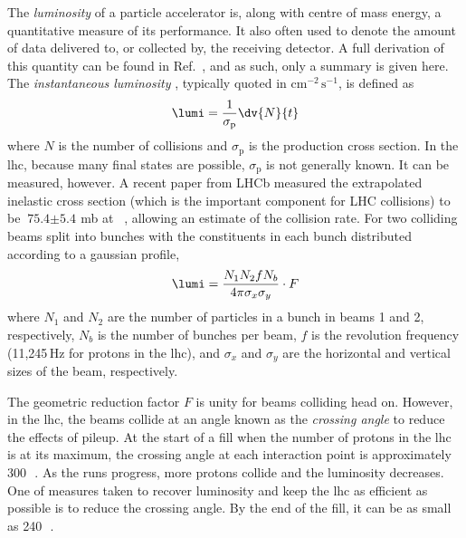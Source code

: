 The \emph{\gls{luminosity}} of a particle accelerator is, along with centre of mass energy, a quantitative measure of its performance. It also often used to denote the amount of data delivered to, or collected by, the receiving detector. A full derivation of this quantity can be found in Ref.~, and as such, only a summary is given here. The \emph{instantaneous luminosity} \lumi, typically quoted in $\text{cm}^{-2}\,\text{s}^{-1}$, is defined as
\begin{equation}
    \lumi = \frac{1}{\sigma_{\mathrm{p}}} \dv{N}{t}
    \label{eq:lumi_instantaneous}
\end{equation}
where $N$ is the number of collisions and $\sigma_{\mathrm{p}}$ is the production cross section. In the \acrshort{lhc}, because many final states are possible, $\sigma_{\mathrm{p}}$ is not generally known. It can be measured, however. A recent paper from LHCb measured the extrapolated inelastic cross section (which is the important component for LHC collisions) to be $\text{75.4} \pm \text{5.4}$\,mb at \comruntwo~\cite{Aaij:2018okq}, allowing an estimate of the collision rate. For two colliding beams split into bunches with the constituents in each bunch distributed according to a gaussian profile,
\begin{equation}
    \lumi = \frac{N_1 N_2 f N_b}{4 \pi \sigma_x \sigma_y} \cdot F %
    \label{eq:lumi_inst_head_on_colliding_beams}
\end{equation}
where $N_1$ and $N_2$ are the number of particles in a bunch in beams 1 and 2, respectively, $N_b$ is the number of bunches per beam, $f$ is the revolution frequency (11,245\,Hz for protons in the \acrshort{lhc}), and $\sigma_x$ and $\sigma_y$ are the horizontal and vertical sizes of the beam, respectively.

The geometric reduction factor $F$ is unity for beams colliding head on. However, in the \acrshort{lhc}, the beams collide at an angle known as the \emph{crossing angle} to reduce the effects of \gls{pileup}. At the start of a fill when the number of protons in the \acrshort{lhc} is at its maximum, the crossing angle at each interaction point is approximately 300\,\si{\micro{}}. As the runs progress, more protons collide and the luminosity decreases. One of measures taken to recover luminosity and keep the \acrshort{lhc} as efficient as possible is to reduce the crossing angle. By the end of the fill, it can be as small as 240\,\si{\micro{}}.


